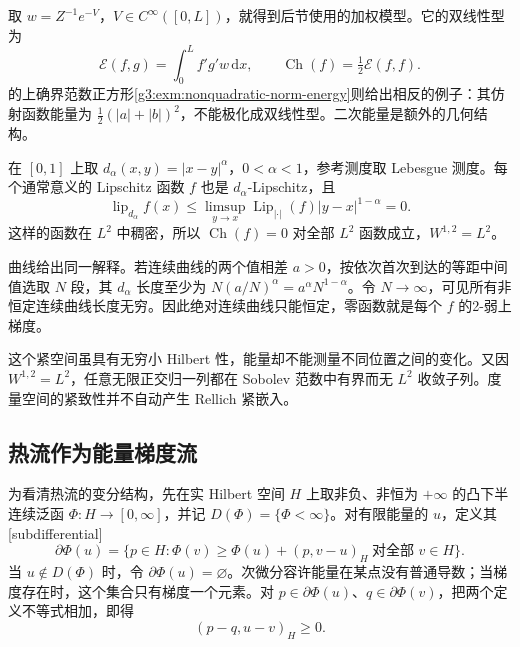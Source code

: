 取 \(w=Z^{-1}e^{-V}\)，\(V\in C^\infty([0,L])\)，就得到后节使用的加权模型。它的双线性型为
\[
	\mathcal E(f,g)=\int_0^Lf'g'w\,\mathrm dx,
	\qquad \operatorname{Ch}(f)=\tfrac12\mathcal E(f,f).
\]
的上确界范数正方形\cref{g3:exm:nonquadratic-norm-energy}则给出相反的例子：其仿射函数能量为 \(\tfrac12(|a|+|b|)^2\)，不能极化成双线性型。二次能量是额外的几何结构。

\begin{example}\label{g3:exm:C-snowflake-zero-energy}
	在 \([0,1]\) 上取 \(d_\alpha(x,y)=|x-y|^\alpha\)，\(0<\alpha<1\)，参考测度取 Lebesgue 测度。每个通常意义的 Lipschitz 函数 \(f\) 也是 \(d_\alpha\)-Lipschitz，且
	\[
		\operatorname{lip}_{d_\alpha}f(x)
		\le\limsup_{y\to x}\operatorname{Lip}_{|\cdot|}(f)|y-x|^{1-\alpha}=0.
	\]
	这样的函数在 \(L^2\) 中稠密，所以 \(\operatorname{Ch}(f)=0\) 对全部 \(L^2\) 函数成立，\(W^{1,2}=L^2\)。

	曲线给出同一解释。若连续曲线的两个值相差 \(a>0\)，按依次首次到达的等距中间值选取 \(N\) 段，其 \(d_\alpha\) 长度至少为 \(N(a/N)^\alpha=a^\alpha N^{1-\alpha}\)。令 \(N\to\infty\)，可见所有非恒定连续曲线长度无穷。因此绝对连续曲线只能恒定，零函数就是每个 \(f\) 的2-弱上梯度。

	这个紧空间虽具有无穷小 Hilbert 性，能量却不能测量不同位置之间的变化。又因 \(W^{1,2}=L^2\)，任意无限正交归一列都在 Sobolev 范数中有界而无 \(L^2\) 收敛子列。度量空间的紧致性并不自动产生 Rellich 紧嵌入。
\end{example}

\subsection{热流作为能量梯度流}
\label{g3:subsec:C02:03}
为看清热流的变分结构，先在实 Hilbert 空间 \(H\) 上取非负、非恒为 \(+\infty\) 的凸下半连续泛函 \(\Phi:H\to[0,\infty]\)，并记 \(D(\Phi)=\{\Phi<\infty\}\)。对有限能量的 \(u\)，定义其[subdifferential]
\[
	\partial\Phi(u)=\{p\in H:\Phi(v)\ge\Phi(u)+(p,v-u)_H\ \text{对全部 }v\in H\}.
\]
当 \(u\notin D(\Phi)\) 时，令 \(\partial\Phi(u)=\varnothing\)。次微分容许能量在某点没有普通导数；当梯度存在时，这个集合只有梯度一个元素。对 \(p\in\partial\Phi(u)\)、\(q\in\partial\Phi(v)\)，把两个定义不等式相加，即得
\begin{equation}\label{g3:eq:C-subgradient-monotonicity}
	(p-q,u-v)_H\ge0.
\end{equation}

